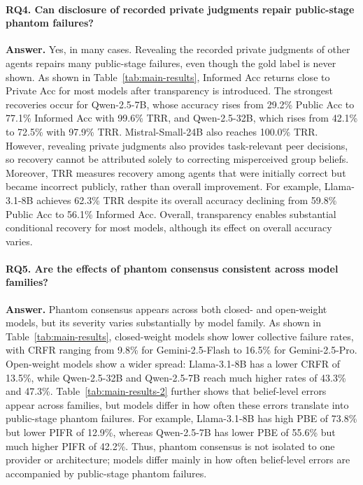 \documentclass{article}
\begin{document}
\paragraph{RQ4. Can disclosure of recorded private judgments repair public-stage phantom failures?}

\textbf{Answer.} Yes, in many cases. Revealing the recorded private judgments of other agents repairs many public-stage failures, even though the gold label is never shown. As shown in Table~\ref{tab:main-results}, Informed Acc returns close to Private Acc for most models after transparency is introduced. The strongest recoveries occur for Qwen-2.5-7B, whose accuracy rises from 29.2\% Public Acc to 77.1\% Informed Acc with 99.6\% TRR, and Qwen-2.5-32B, which rises from 42.1\% to 72.5\% with 97.9\% TRR. Mistral-Small-24B also reaches 100.0\% TRR. However, revealing private judgments also provides task-relevant peer decisions, so recovery cannot be attributed solely to correcting misperceived group beliefs. Moreover, TRR measures recovery among agents that were initially correct but became incorrect publicly, rather than overall improvement. For example, Llama-3.1-8B achieves 62.3\% TRR despite its overall accuracy declining from 59.8\% Public Acc to 56.1\% Informed Acc. Overall, transparency enables substantial conditional recovery for most models, although its effect on overall accuracy varies.


\paragraph{RQ5. Are the effects of phantom consensus consistent across model families?}

\textbf{Answer.} Phantom consensus appears across both closed- and open-weight models, but its severity varies substantially by model family. As shown in Table~\ref{tab:main-results}, closed-weight models show lower collective failure rates, with CRFR ranging from 9.8\% for Gemini-2.5-Flash to 16.5\% for Gemini-2.5-Pro. Open-weight models show a wider spread: Llama-3.1-8B has a lower CRFR of 13.5\%, while Qwen-2.5-32B and Qwen-2.5-7B reach much higher rates of 43.3\% and 47.3\%. Table~\ref{tab:main-results-2} further shows that belief-level errors appear across families, but models differ in how often these errors translate into public-stage phantom failures. For example, Llama-3.1-8B has high PBE of 73.8\% but lower PIFR of 12.9\%, whereas Qwen-2.5-7B has lower PBE of 55.6\% but much higher PIFR of 42.2\%. Thus, phantom consensus is not isolated to one provider or architecture; models differ mainly in how often belief-level errors are accompanied by public-stage phantom failures.
\end{document}
